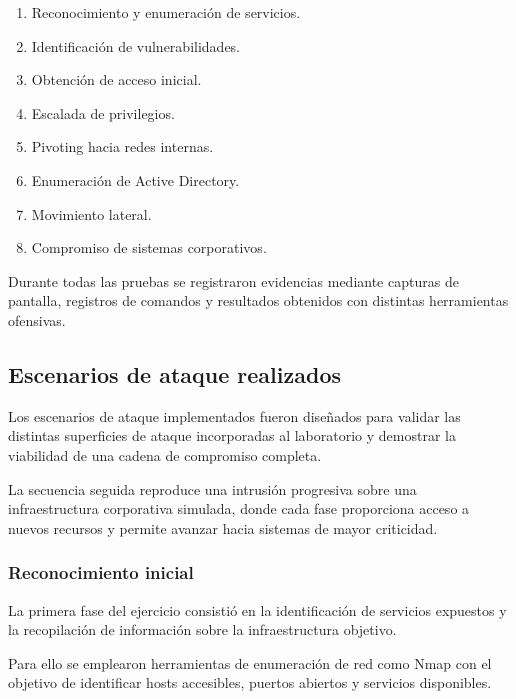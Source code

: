 \begin{enumerate}
    \item Reconocimiento y enumeración de servicios.
    \item Identificación de vulnerabilidades.
    \item Obtención de acceso inicial.
    \item Escalada de privilegios.
    \item Pivoting hacia redes internas.
    \item Enumeración de Active Directory.
    \item Movimiento lateral.
    \item Compromiso de sistemas corporativos.
\end{enumerate}

Durante todas las pruebas se registraron evidencias mediante capturas de pantalla, registros de comandos y resultados obtenidos con distintas herramientas ofensivas.


\subsection{Escenarios de ataque realizados}

Los escenarios de ataque implementados fueron diseñados para validar las distintas superficies de ataque incorporadas al laboratorio y demostrar la viabilidad de una cadena de compromiso completa.

La secuencia seguida reproduce una intrusión progresiva sobre una infraestructura corporativa simulada, donde cada fase proporciona acceso a nuevos recursos y permite avanzar hacia sistemas de mayor criticidad.


\subsubsection{Reconocimiento inicial}

La primera fase del ejercicio consistió en la identificación de servicios expuestos y la recopilación de información sobre la infraestructura objetivo.

Para ello se emplearon herramientas de enumeración de red como Nmap con el objetivo de identificar hosts accesibles, puertos abiertos y servicios disponibles.

